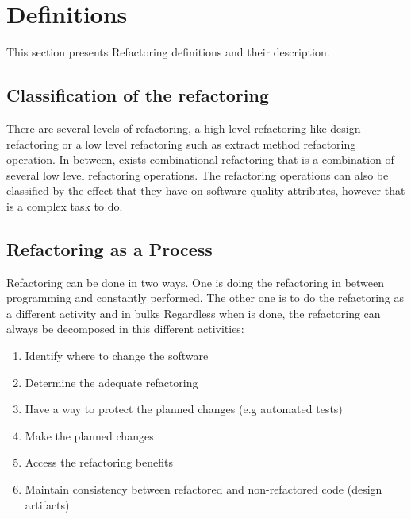 \section{Definitions}


This section presents Refactoring definitions and their description.

\subsection{Classification of the refactoring}
There are several levels of refactoring, a high level refactoring like design refactoring or a low level refactoring such as extract method refactoring operation. 
In between, exists combinational refactoring that is a combination of several low level refactoring operations.
The refactoring operations can also be classified by the effect that they have on software quality attributes, however that is a complex task to do. \cite{elish2011classification}

\subsection{Refactoring as a Process}
Refactoring can be done in two ways. %
One is doing the refactoring in between programming and constantly performed. 
The other one is to do the refactoring as a different activity and in bulks
Regardless when is done, the refactoring can always be decomposed in this different activities:

\begin{enumerate}
 \item Identify where to change the software
 \item Determine the adequate refactoring
 \item Have a way to protect the planned changes (e.g automated tests)
 \item Make the planned changes
 \item Access the refactoring benefits
 \item Maintain consistency between refactored and non-refactored code (design artifacts)
\end{enumerate}




